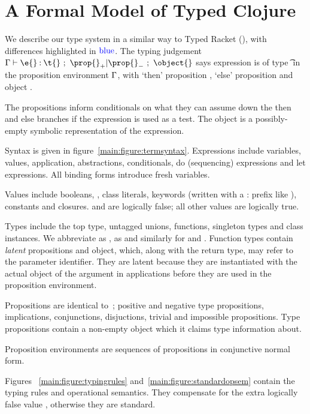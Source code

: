 \section{A Formal Model of Typed Clojure}

We describe our type system in a similar way to Typed Racket (\citet{TF10}),
with differences highlighted in $\mathbin{\textcolor{blue}{\text{blue}}}$.
The typing judgement 
$
{\judgement   {\propenv}
              {\hastype {\e{}} {\t{}}}
  {\filterset {\thenprop {\prop{}}}
              {\elseprop {\prop{}}}}
  {\object{}}}
$
says expression \e{} is of type \t{} in the 
proposition environment $\Gamma{}$, with 
`then' proposition {\thenprop {\prop{}}}, `else' proposition {\elseprop {\prop{}}}
and object \object{}.

The propositions inform conditionals on what they can assume down the then and else
branches if the expression is used as a test.
The object is a possibly-empty symbolic representation of the expression.

Syntax is given in figure~\ref{main:figure:termsyntax}. Expressions include variables, values,
application, abstractions, conditionals, do (sequencing) expressions and let expressions.
All binding forms introduce fresh variables.

Values include booleans, \nil{}, class literals, keywords (written with a : prefix like ), 
constants and closures.  \false{} and \nil{} are logically false; all other values are logically true.

Types include the top type, untagged unions, functions, singleton types
and class instances. We abbreviate \EmptyUnion{} as \Bot{}, {\ValueNil} as \Nil{} and similarly
for \True and \False.
Function types contain \emph{latent} propositions and object, which, along with the return type,
may refer to the parameter identifier. They are latent because they are instantiated with the
actual object of the argument in applications before they are used in the proposition environment.

Propositions are identical to~\cite{TF10}; positive and negative type propositions, implications,
conjunctions, disjuctions, trivial and impossible propositions.
Type propositions contain a non-empty object which it claims type information about.

Proposition environments are sequences of propositions in conjunctive normal form.

Figures ~\ref{main:figure:typingrules} and~\ref{main:figure:standardopsem}
contain the typing rules and operational semantics.
They compensate for the extra logically false value \nil{}, otherwise they are standard.

